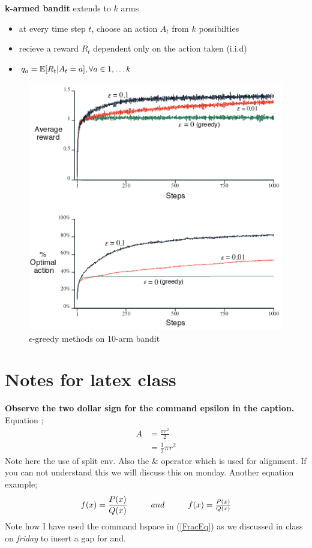 \documentclass[10pt,a4paper]{report}
\begin{document}
\textbf{k-armed bandit} extends to $k$ arms
\begin{itemize}
    \item at every time step $t$, choose an action $A_t$ from $k$ possibilties
    \item recieve a reward $R_t$ dependent only on the action taken (i.i.d)
    \item $q_{a} = \mathbb{E} [R_t | A_t = a], \medskip \forall a \in {1, \dots k }$
\end{itemize}

\vspace{2cm}
\begin{figure}[ht]
    \centering
    \includegraphics[width=0.9\linewidth]{epsilon_10arm.png}
    \caption{$\epsilon$-greedy methods on 10-arm bandit}
    \label{fig:Greedy}
\end{figure}
\section{Notes for latex class}
\textbf{Observe the two dollar sign for the command epsilon in the caption.} \\
Equation ;
\begin{equation}
\label{eq1}
	\begin{split}
	A & = \frac{\pi r^2}{2} \\
	 & = \frac{1}{2} \pi r^2
	\end{split}
\end{equation}
Note here the use of split env. Also the $\&$ operator which is used for alignment. If you can not understand this we will discuss this on monday.
Another equation example;
\begin{equation}
\label{FracEq}
f(x)=\frac{P(x)}{Q(x)} \\ \hspace{1cm} and \hspace{1cm}
	f(x)=\textstyle\frac{P(x)}{Q(x)}
\end{equation}
Note how I have used the command hspace in  (\ref{FracEq}) as we discussed in class on \textit{friday} to insert a gap for and.
\end{document}
